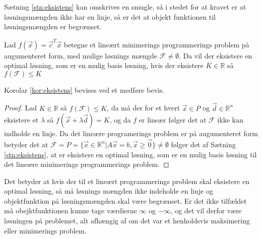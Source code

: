 Sætning \ref{stn:eksistens} kan omskrives en smugle, så i stedet for at kravet er at løsningsmængden ikke har en linje, så er det at objekt funktionen til løsningsmængden er begrænset.
\begin{kor}
Lad $f(\vec{x}) = \vec{c}^T\vec{x}$ betegne et lineært minimerings programmerings problem på augumenteret form, med mulige løsnings mængde $\mathcal{F} \neq \emptyset$. 
Da vil der eksistere en optimal løsning, som er en mulig basis løsning, hvis der eksistere $K \in \mathds{R}$ så $f(\mathcal{F}) \leq K$ 
\label{kor:eksistens}
\end{kor}
Korolar \ref{kor:eksistens} bevises ved et medføre bevis.
\begin{proof}
Lad  $K \in \mathds{R}$ så $f(\mathcal{F}) \leq K$, da må der for et hvert $\vec{x} \in P$ og $\vec{d} \in \mathds{R}^n$ eksistere et $\lambda$ så $f(\vec{x}+\lambda \vec{d}) = K$, og da $f$ er lineær følger det at $\mathcal{F}$ ikke kan indholde en linje. 
Da det lineære programerings problem er på augumenteret form betyder det at $\mathcal{F}=P=\{\vec{x} \in \mathds{R}^n| A \vec{x} = b, \vec{x} \geq \vec{0}\} \neq \emptyset$ følger det af Sætning \ref{stn:eksistens}, at er eksistere en optimal løsning, som er en mulig basis løsning til det lineære minimerings programmerings problem.
\end{proof}
Det betyder at hvis der til et lineært programmerings problem skal eksistere en optimal løsning, så må løsnings mængden ikke indeholde en linje og objektfunktion på løsningsmængden skal være begrænset. 
Er det ikke tilfældet må obejktfunktionen kunne tage værdierne $\infty$ og $-\infty$, og det vil derfor være løsningen på problemet, alt afhængig af om det var et henholdsvis maksimering eller minimerings problem.

